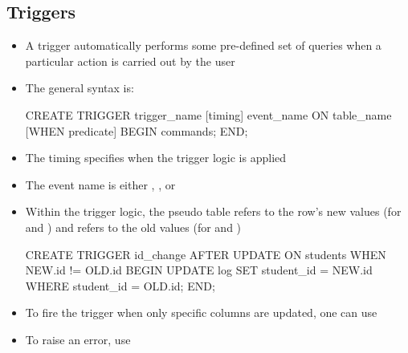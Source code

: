 \documentclass[a4paper]{article}
\begin{document}
\subsection{Triggers}
\begin{itemize}
    \item A trigger automatically performs some pre-defined set of queries when a particular action is carried out by the user
    \item The general syntax is:
\begin{sql}
CREATE TRIGGER trigger_name [timing] event_name
ON table_name [WHEN predicate] BEGIN
    commands;
END;
\end{sql}
    \item The timing specifies when the trigger logic is applied
    \item The event name is either , , or 
    \item Within the trigger logic, the pseudo table  refers to the row's new values (for  and ) and  refers to the old values (for  and )
\begin{sql}
CREATE TRIGGER id_change AFTER UPDATE ON students WHEN NEW.id != OLD.id
BEGIN
    UPDATE log SET student_id = NEW.id WHERE student_id = OLD.id;
END;
\end{sql}
    \item To fire the trigger when only specific columns are updated, one can use 
    \item To raise an error, use 
    \begin{arrows}

\end{arrows}
\end{itemize}
\end{document}
